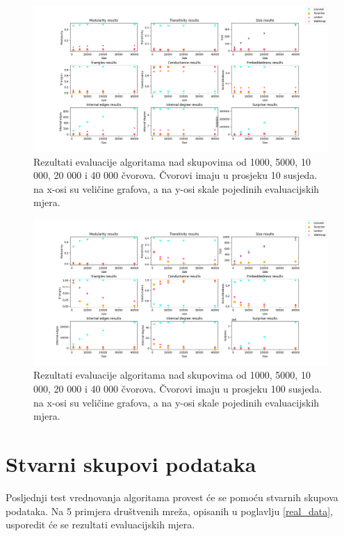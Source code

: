\begin{figure}
	\includegraphics[width=\linewidth]{images/test2_10.png}
	\caption{Rezultati evaluacije algoritama nad skupovima od 1000, 5000, 10 000, 20 000 i 40 000 čvorova. Čvorovi imaju u prosjeku 10 susjeda. na x-osi su veličine grafova, a na y-osi skale pojedinih evaluacijskih mjera.}
	\label{fig:test2_10}
\end{figure}

\begin{figure}
	\includegraphics[width=\linewidth]{images/test2_100.png}
	\caption{Rezultati evaluacije algoritama nad skupovima od 1000, 5000, 10 000, 20 000 i 40 000 čvorova. Čvorovi imaju u prosjeku 100 susjeda. na x-osi su veličine grafova, a na y-osi skale pojedinih evaluacijskih mjera.}
	\label{fig:test2_100}
\end{figure}


\section{Stvarni skupovi podataka}

Posljednji test vrednovanja algoritama provest će se pomoću stvarnih skupova podataka. Na 5 primjera društvenih mreža, opisanih u poglavlju \ref{real_data}, usporedit će se rezultati evaluacijskih mjera.

